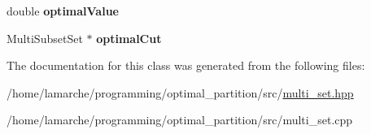 \begin{DoxyCompactItemize}
\item 
\hypertarget{classMultiSubset_a81cd9865a90acb0f0fef1380caf49924}{double {\bfseries optimal\-Value}}\label{classMultiSubset_a81cd9865a90acb0f0fef1380caf49924}

\item 
\hypertarget{classMultiSubset_a2351a70cf4da1c2d1872c05eac77469a}{Multi\-Subset\-Set $\ast$ {\bfseries optimal\-Cut}}\label{classMultiSubset_a2351a70cf4da1c2d1872c05eac77469a}

\end{DoxyCompactItemize}


The documentation for this class was generated from the following files\-:\begin{DoxyCompactItemize}
\item 
/home/lamarche/programming/optimal\-\_\-partition/src/\hyperlink{multi__set_8hpp}{multi\-\_\-set.\-hpp}\item 
/home/lamarche/programming/optimal\-\_\-partition/src/multi\-\_\-set.\-cpp\end{DoxyCompactItemize}

